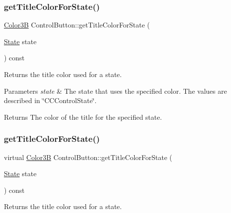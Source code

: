 \subsubsection{\texorpdfstring{get\+Title\+Color\+For\+State()}{getTitleColorForState()}\hspace{0.1cm}{\footnotesize\ttfamily [1/2]}}
{\footnotesize\ttfamily \hyperlink{structColor3B}{Color3B} Control\+Button\+::get\+Title\+Color\+For\+State (\begin{DoxyParamCaption}\item[{\hyperlink{classControl_a89e9598cd785841ac91cff3c4798c469}{State}}]{state }\end{DoxyParamCaption}) const\hspace{0.3cm}{\ttfamily [virtual]}}

Returns the title color used for a state.


\begin{DoxyParams}{Parameters}
{\em state} & The state that uses the specified color. The values are described in \char`\"{}\+C\+C\+Control\+State\char`\"{}.\\
\hline
\end{DoxyParams}
\begin{DoxyReturn}{Returns}
The color of the title for the specified state. 
\end{DoxyReturn}
\mbox{\label{classControlButton_a8600aaa72e3bbddd9d02d4b0c500ad2c}} 
\subsubsection{\texorpdfstring{get\+Title\+Color\+For\+State()}{getTitleColorForState()}\hspace{0.1cm}{\footnotesize\ttfamily [2/2]}}
{\footnotesize\ttfamily virtual \hyperlink{structColor3B}{Color3B} Control\+Button\+::get\+Title\+Color\+For\+State (\begin{DoxyParamCaption}\item[{\hyperlink{classControl_a89e9598cd785841ac91cff3c4798c469}{State}}]{state }\end{DoxyParamCaption}) const\hspace{0.3cm}{\ttfamily [virtual]}}

Returns the title color used for a state.


